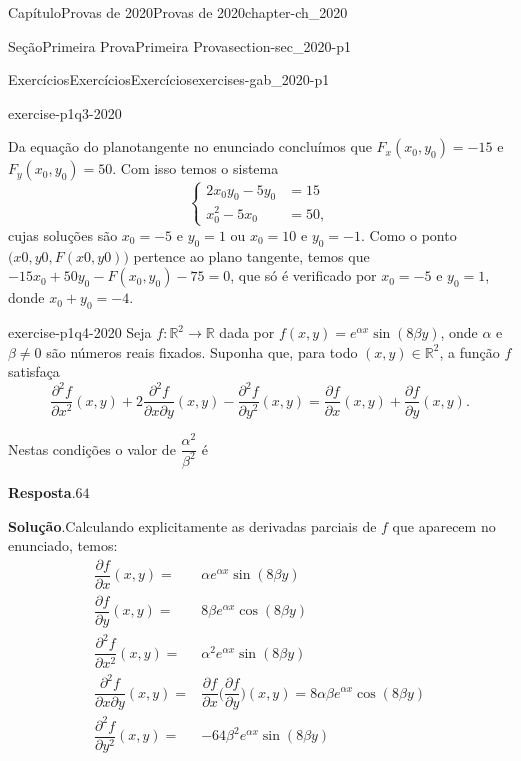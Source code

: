 \documentclass[oneside,10pt,]{book}
\newcommand{\blocktitlefont}{\relax}
\numberwithin{equation}{section}
\newcommand{\R}{\mathbb R}
\begin{document}
\begin{chapterptx}{Capítulo}{Provas de 2020}{}{Provas de 2020}{}{}{chapter-ch_2020}
\begin{sectionptx}{Seção}{Primeira Prova}{}{Primeira Prova}{}{}{section-sec_2020-p1}
\begin{exercises-subsection-numberless}{Exercícios}{Exercícios}{}{Exercícios}{}{}{exercises-gab_2020-p1}
\begin{divisionexercise}{3}{}{}{exercise-p1q3-2020}
\par
Da equação do planotangente no enunciado concluímos que \(F_x(x_0,y_0)=-15\) e \(F_y(x_0,y_0)=50\). Com isso temos o sistema%
\begin{equation*}
\begin{cases}
2x_0y_0-5y_0&=15\\
x^2_0-5x_0&=50,
\end{cases}
\end{equation*}
cujas soluções são \(x_0=-5\) e \(y_0=1\) ou \(x_0=10\) e \(y_0=-1\). Como o ponto \(\big(x0,y0,F(x0,y0)\big)\) pertence ao plano tangente, temos que \(-15x_0+50y_0-F(x_0,y_0)-75=0\), que só é verificado por \(x_0=-5\) e \(y_0=1\), donde \(x_0+y_0=-4\).%
\end{divisionexercise}%
\begin{divisionexercise}{4}{}{}{exercise-p1q4-2020}%
Seja \(f\colon\R^2\to\R\) dada por \(f(x,y)=e^{\alpha
x}\sin(8\beta y)\), onde \(\alpha\) e \(\beta\neq 0\) são números reais fixados. Suponha que, para todo \((x,y)\in\R^2\), a função \(f\) satisfaça%
\begin{equation*}
\dfrac{\partial^2 f}{\partial x^2}(x,y)+2\dfrac{\partial^2
f}{\partial x\partial y}(x,y)-\dfrac{\partial^2 f}{\partial
y^2}(x,y)=\dfrac{\partial f}{\partial x}(x,y)+\dfrac{\partial
f}{\partial y}(x,y).
\end{equation*}
%
\par
Nestas condições o valor de \(\dfrac{\alpha^2}{\beta^2}\) é%
\par\smallskip%
\noindent\textbf{\blocktitlefont Resposta}.\hypertarget{answer-p1q4-2020-b}{}\quad{}\(64\)%
\par\smallskip%
\noindent\textbf{\blocktitlefont Solução}.\hypertarget{solution-p1q4-2020-c}{}\quad{}Calculando explicitamente as derivadas parciais de \(f\) que aparecem no enunciado, temos:%
\begin{align*}
\dfrac{\partial f}{\partial x}(x,y)=&\alpha e^{\alpha
x}\sin(8\beta y)\\
\dfrac{\partial f}{\partial y}(x,y)=&8\beta e^{\alpha
x}\cos(8\beta y)\\
\dfrac{\partial^2 f}{\partial x^2}(x,y)=&\alpha^2 e^{\alpha
x}\sin(8\beta y)\\
\dfrac{\partial^2 f}{\partial x\partial y}(x,y)=&
\dfrac{\partial f}{\partial x}\Big(\dfrac{\partial f}{\partial
y}\Big)(x,y)=8\alpha\beta e^{\alpha x}\cos(8\beta y)\\
\dfrac{\partial^2 f}{\partial y^2}(x,y)=&-64\beta^2 e^{\alpha
x}\sin(8\beta y)
\end{align*}

\end{divisionexercise}
\end{exercises-subsection-numberless}
\end{sectionptx}
\end{chapterptx}
\end{document}
